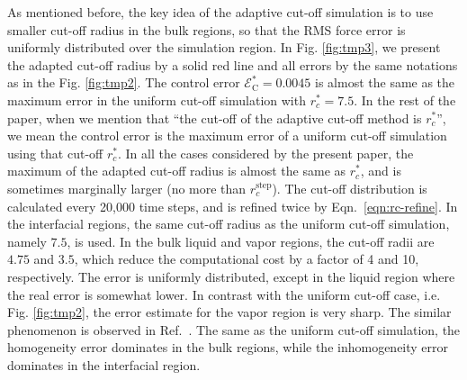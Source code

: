 \documentclass[aps,pre,preprint]{revtex4}
\newcommand{\recheck}[1]{{\color{red} #1}}
\begin{document}
As mentioned before, the key idea of the adaptive cut-off simulation
is to use smaller cut-off
radius in the bulk regions, so that the RMS force error is uniformly
distributed over the simulation region. In Fig. \ref{fig:tmp3}, we
present the adapted cut-off radius by a solid red line and all errors
by the same notations as in the Fig. \ref{fig:tmp2}. The control error
$\mathcal E^\ast_{\textrm{C}} = 0.0045$ is almost the same as the maximum
error in the uniform cut-off simulation with $r_c^\ast=7.5$.
\recheck{
  In the rest of the paper, when we mention that ``the cut-off of
  the adaptive cut-off method is $r_c^\ast$'', we mean the
  control error is the maximum error of a uniform cut-off simulation
  using that cut-off $r_c^\ast$. In all the cases considered by
  the present paper, the maximum of
  the adapted cut-off radius is almost the same as $r_c^\ast$,
  and is sometimes marginally larger (no more than $r_c^\textrm{step}$).
}
The
cut-off distribution is calculated every 20,000 time steps, and is
refined twice by Eqn.~\eqref{eqn:rc-refine}. In the interfacial
regions, the same cut-off radius as the uniform cut-off simulation,
namely $7.5$, is used.  In the bulk
liquid and vapor regions, the cut-off radii are $4.75$ and $3.5$,
which reduce the computational cost
by a factor of 4 and 10, respectively.
The error is uniformly distributed, except in the
liquid region where the real error is somewhat lower.
In contrast with the uniform
cut-off case, i.e. Fig. \ref{fig:tmp2}, the error estimate for the
vapor region is very sharp.
The similar phenomenon is observed in
Ref.~\cite{wang2011}.
The same as the uniform cut-off simulation, the
homogeneity error dominates in the bulk regions, while the
inhomogeneity error dominates in the interfacial region.
\end{document}
